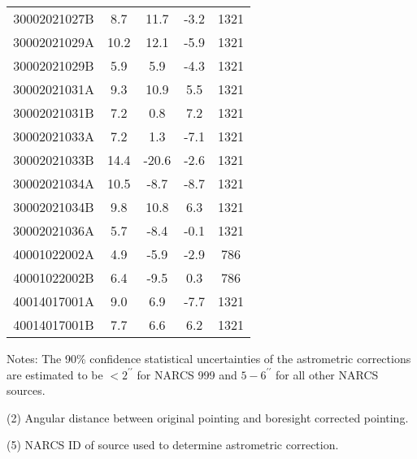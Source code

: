 \documentclass[iop,revtex4]{emulateapj}
\begin{document}
\begin{table}
{\begin{threeparttable}
\begin{tabular}{ccccc}
30002021027B&8.7&11.7&-3.2&1321\\
30002021029A&10.2&12.1&-5.9&1321\\
30002021029B&5.9&5.9&-4.3&1321\\
30002021031A&9.3&10.9&5.5&1321\\
30002021031B&7.2&0.8&7.2&1321\\
30002021033A&7.2&1.3&-7.1&1321\\
30002021033B&14.4&-20.6&-2.6&1321\\
30002021034A&10.5&-8.7&-8.7&1321\\
30002021034B&9.8&10.8&6.3&1321\\
30002021036A&5.7&-8.4&-0.1&1321\\
40001022002A&4.9&-5.9&-2.9&786\\
40001022002B&6.4&-9.5&0.3&786\\
40014017001A&9.0&6.9&-7.7&1321\\
40014017001B&7.7&6.6&6.2&1321\\
\hline \hline
\end{tabular}
\begin{tablenotes}[flushleft]
\item Notes: The 90\% confidence statistical uncertainties of the astrometric corrections are estimated to be $<2^{\prime\prime}$ for NARCS 999 and $5-6^{\prime\prime}$ for all other NARCS sources.

\item (2) Angular distance between original pointing and boresight corrected pointing.  

\item (5) NARCS ID of source used to determine astrometric correction.

\end{tablenotes}
\label{tab:shift}
\end{threeparttable}}
\end{table}
\newpage
\end{document}
